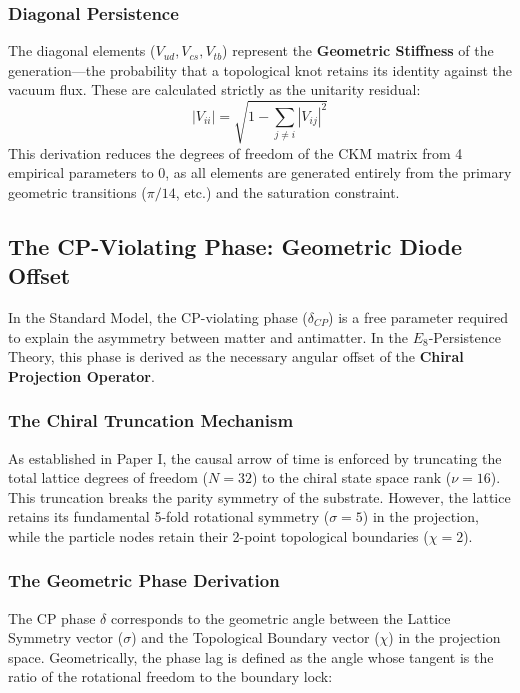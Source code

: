 \subsubsection{Diagonal Persistence}
The diagonal elements ($V_{ud}, V_{cs}, V_{tb}$) represent the \textbf{Geometric Stiffness} of the generation—the probability that a topological knot retains its identity against the vacuum flux. These are calculated strictly as the unitarity residual:
\begin{equation}
|V_{ii}| = \sqrt{1 - \sum_{j \neq i} |V_{ij}|^2}
\end{equation}
This derivation reduces the degrees of freedom of the CKM matrix from 4 empirical parameters to 0, as all elements are generated entirely from the primary geometric transitions ($\pi/14$, etc.) and the saturation constraint.

\subsection{The CP-Violating Phase: Geometric Diode Offset}

In the Standard Model, the CP-violating phase ($\delta_{CP}$) is a free parameter required to explain the asymmetry between matter and antimatter. In the $E_8$-Persistence Theory, this phase is derived as the necessary angular offset of the \textbf{Chiral Projection Operator}.

\subsubsection{The Chiral Truncation Mechanism}
As established in Paper I, the causal arrow of time is enforced by truncating the total lattice degrees of freedom ($N=32$) to the chiral state space rank ($\nu=16$). This truncation breaks the parity symmetry of the substrate. However, the lattice retains its fundamental 5-fold rotational symmetry ($\sigma=5$) in the projection, while the particle nodes retain their 2-point topological boundaries ($\chi=2$).

\subsubsection{The Geometric Phase Derivation}
The CP phase $\delta$ corresponds to the geometric angle between the Lattice Symmetry vector ($\sigma$) and the Topological Boundary vector ($\chi$) in the projection space. Geometrically, the phase lag is defined as the angle whose tangent is the ratio of the rotational freedom to the boundary lock:

